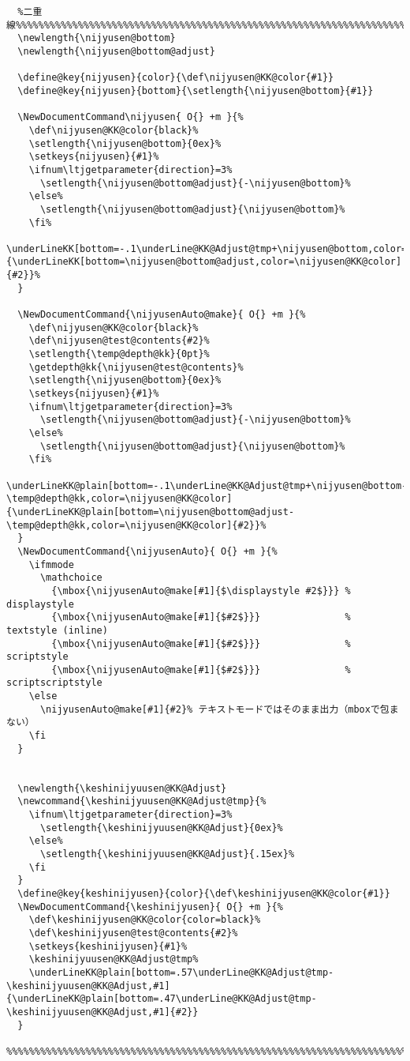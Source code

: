 \documentclass[luatex,fontsize=8pt,paper=b5,twoside]{jlreq}%
\begin{document}
\begin{lstlisting}
  %二重線%%%%%%%%%%%%%%%%%%%%%%%%%%%%%%%%%%%%%%%%%%%%%%%%%%%%%%%%%%%%%%%%%%%%%%%%%%%%%%%%%%
  \newlength{\nijyusen@bottom}
  \newlength{\nijyusen@bottom@adjust}

  \define@key{nijyusen}{color}{\def\nijyusen@KK@color{#1}}
  \define@key{nijyusen}{bottom}{\setlength{\nijyusen@bottom}{#1}}

  \NewDocumentCommand\nijyusen{ O{} +m }{%
    \def\nijyusen@KK@color{black}%
    \setlength{\nijyusen@bottom}{0ex}%
    \setkeys{nijyusen}{#1}%
    \ifnum\ltjgetparameter{direction}=3%
      \setlength{\nijyusen@bottom@adjust}{-\nijyusen@bottom}%
    \else%
      \setlength{\nijyusen@bottom@adjust}{\nijyusen@bottom}%
    \fi%
    \underLineKK[bottom=-.1\underLine@KK@Adjust@tmp+\nijyusen@bottom,color=\nijyusen@KK@color]{\underLineKK[bottom=\nijyusen@bottom@adjust,color=\nijyusen@KK@color]{#2}}%
  }

  \NewDocumentCommand{\nijyusenAuto@make}{ O{} +m }{%
    \def\nijyusen@KK@color{black}%
    \def\nijyusen@test@contents{#2}%
    \setlength{\temp@depth@kk}{0pt}%
    \getdepth@kk{\nijyusen@test@contents}%
    \setlength{\nijyusen@bottom}{0ex}%
    \setkeys{nijyusen}{#1}%
    \ifnum\ltjgetparameter{direction}=3%
      \setlength{\nijyusen@bottom@adjust}{-\nijyusen@bottom}%
    \else%
      \setlength{\nijyusen@bottom@adjust}{\nijyusen@bottom}%
    \fi%
    \underLineKK@plain[bottom=-.1\underLine@KK@Adjust@tmp+\nijyusen@bottom-\temp@depth@kk,color=\nijyusen@KK@color]{\underLineKK@plain[bottom=\nijyusen@bottom@adjust-\temp@depth@kk,color=\nijyusen@KK@color]{#2}}%
  }
  \NewDocumentCommand{\nijyusenAuto}{ O{} +m }{%
    \ifmmode
      \mathchoice
        {\mbox{\nijyusenAuto@make[#1]{$\displaystyle #2$}}} % displaystyle
        {\mbox{\nijyusenAuto@make[#1]{$#2$}}}               % textstyle (inline)
        {\mbox{\nijyusenAuto@make[#1]{$#2$}}}               % scriptstyle
        {\mbox{\nijyusenAuto@make[#1]{$#2$}}}               % scriptscriptstyle
    \else
      \nijyusenAuto@make[#1]{#2}% テキストモードではそのまま出力（mboxで包まない）
    \fi
  }


  \newlength{\keshinijyuusen@KK@Adjust}
  \newcommand{\keshinijyuusen@KK@Adjust@tmp}{%
    \ifnum\ltjgetparameter{direction}=3%
      \setlength{\keshinijyuusen@KK@Adjust}{0ex}%
    \else%
      \setlength{\keshinijyuusen@KK@Adjust}{.15ex}%
    \fi
  }
  \define@key{keshinijyusen}{color}{\def\keshinijyusen@KK@color{#1}}
  \NewDocumentCommand{\keshinijyusen}{ O{} +m }{%
    \def\keshinijyusen@KK@color{color=black}%
    \def\keshinijyusen@test@contents{#2}%
    \setkeys{keshinijyusen}{#1}%
    \keshinijyuusen@KK@Adjust@tmp%
    \underLineKK@plain[bottom=.57\underLine@KK@Adjust@tmp-\keshinijyuusen@KK@Adjust,#1]{\underLineKK@plain[bottom=.47\underLine@KK@Adjust@tmp-\keshinijyuusen@KK@Adjust,#1]{#2}}
  }
  %%%%%%%%%%%%%%%%%%%%%%%%%%%%%%%%%%%%%%%%%%%%%%%%%%%%%%%%%%%%%%%%%%%%%%%%%%%%%%%%%%%%%%%%%



\end{lstlisting}
\end{document}
